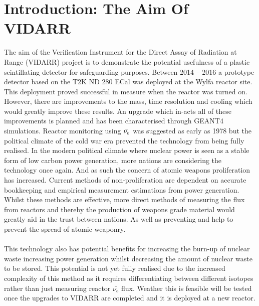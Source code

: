 
\chapter{Introduction: The Aim Of VIDARR} \label{Chap:theAimOfVidarr} %
The aim of the Verification Instrument for the Direct Assay of Radiation at Range (VIDARR) project is to demonstrate the potential usefulness of a plastic scintillating detector for safeguarding purposes. Between 2014 -- 2016 a prototype detector based on the T2K ND 280 ECal \cite{Allan_2013} was deployed at the Wylfa reactor site. This deployment proved successful in measure when the reactor was turned on. However, there are improvements to the mass, time resolution and cooling which would greatly improve these results. An upgrade which in-acts all of these improvements is planned and has been characterised through GEANT4 \cite{Agostinelli:2002hh} simulations. Reactor monitoring using $\Bar{\nu_e}$ was suggested as early as 1978 \cite{Borovoi_1978} but the political climate of the cold war era prevented the technology from being fully realised. In the modern political climate where nuclear power is seen as a stable form of low carbon power generation, more nations are considering the technology once again. And as such the concern of atomic weapons proliferation has increased. Current methods of non-proliferation are dependent on accurate bookkeeping and empirical measurement estimations from power generation. Whilst these methods are effective, more direct methods of measuring the flux from reactors and thereby the production of weapons grade material would greatly aid in the trust between nations. As well as preventing and help to prevent the spread of atomic weaponry. 
\\\\This technology also has potential benefits for increasing the burn-up of nuclear waste increasing power generation whilst decreasing the amount of nuclear waste to be stored. This potential is not yet fully realised due to the increased complexity of this method as it requires differentiating between different isotopes rather than just measuring reactor $\bar{\nu_e}$ flux. Weather this is feasible will be tested once the upgrades to VIDARR are completed and it is deployed at a new reactor.  

